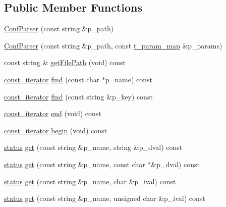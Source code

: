 \subsection*{Public Member Functions}
\begin{DoxyCompactItemize}
\item 
\hyperlink{classxtd_1_1ConfParser_a5f7729df32b946dba9690494b6fee762}{Conf\+Parser} (const string \&p\+\_\+path)
\item 
\hyperlink{classxtd_1_1ConfParser_a460c904cfe815a6141feb088022c9564}{Conf\+Parser} (const string \&p\+\_\+path, const \hyperlink{classxtd_1_1ConfParser_a715a3e39fd796046c94546e60f22414d}{t\+\_\+param\+\_\+map} \&p\+\_\+params)
\item 
const string \& \hyperlink{classxtd_1_1ConfParser_a2a72cefc513e103b86d90785862c620f}{get\+File\+Path} (void) const 
\item 
\hyperlink{classxtd_1_1ConfParser_1_1const__iterator}{const\+\_\+iterator} \hyperlink{classxtd_1_1ConfParser_a18acbfe7e5828eff045bdcc941626974}{find} (const char $\ast$p\+\_\+name) const 
\item 
\hyperlink{classxtd_1_1ConfParser_1_1const__iterator}{const\+\_\+iterator} \hyperlink{classxtd_1_1ConfParser_aff7ee8bcd3de4359eff719bc4a6570ba}{find} (const string \&p\+\_\+key) const 
\item 
\hyperlink{classxtd_1_1ConfParser_1_1const__iterator}{const\+\_\+iterator} \hyperlink{classxtd_1_1ConfParser_ab772ae8e571f1a3f719eca2f9d056d7c}{end} (void) const 
\item 
\hyperlink{classxtd_1_1ConfParser_1_1const__iterator}{const\+\_\+iterator} \hyperlink{classxtd_1_1ConfParser_a18fa4083def8aaf86796b9ddbc331daf}{begin} (void) const 
\item 
\hyperlink{namespacextd_a68ed4fe8e9c11116b68efe5b102aec50}{status} \hyperlink{classxtd_1_1ConfParser_a5ef18d8778c844ce60f2c93579be7926}{get} (const string \&p\+\_\+name, string \&p\+\_\+dval) const 
\item 
\hyperlink{namespacextd_a68ed4fe8e9c11116b68efe5b102aec50}{status} \hyperlink{classxtd_1_1ConfParser_ac8f46e56cdd5d015719c682707b12bc2}{get} (const string \&p\+\_\+name, const char $\ast$\&p\+\_\+dval) const 
\item 
\hyperlink{namespacextd_a68ed4fe8e9c11116b68efe5b102aec50}{status} \hyperlink{classxtd_1_1ConfParser_adaf860ed87b32df2ac16f73cab8bbbed}{get} (const string \&p\+\_\+name, char \&p\+\_\+ival) const 
\item 
\hyperlink{namespacextd_a68ed4fe8e9c11116b68efe5b102aec50}{status} \hyperlink{classxtd_1_1ConfParser_a6edfffe778ba93a7dc0ce3b71e1a293d}{get} (const string \&p\+\_\+name, unsigned char \&p\+\_\+ival) const 

\end{DoxyCompactItemize}
